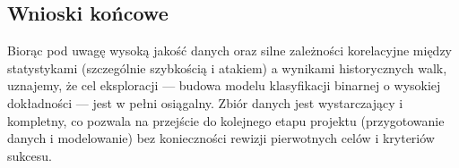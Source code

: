 \documentclass[12pt, a4paper]{report}
\begin{document}

\subsection{Wnioski końcowe}
Biorąc pod uwagę wysoką jakość danych oraz silne zależności korelacyjne między statystykami (szczególnie szybkością i atakiem) a wynikami historycznych walk, uznajemy, że cel eksploracji — budowa modelu klasyfikacji binarnej o wysokiej dokładności — jest w pełni osiągalny. Zbiór danych jest wystarczający i kompletny, co pozwala na przejście do kolejnego etapu projektu (przygotowanie danych i modelowanie) bez konieczności rewizji pierwotnych celów i kryteriów sukcesu.
\newpage
{}

\end{document}
